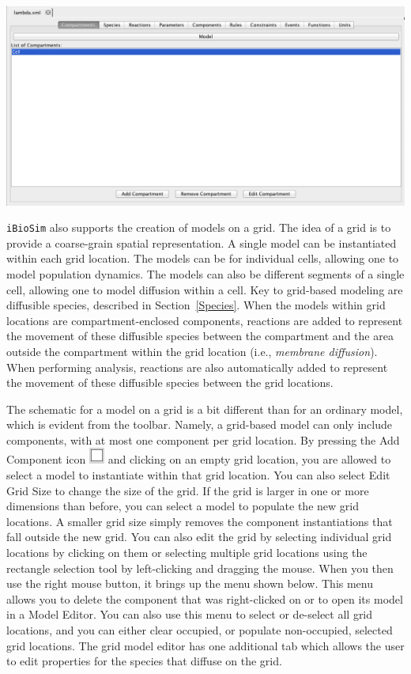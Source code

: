 \documentclass[titlepage,11pt]{article}
\begin{document}
\begin{center}
\includegraphics[width=160mm]{screenshots/textualEditor}
\end{center}

\noindent
{\tt iBioSim} also supports the creation of models on a grid.  The idea of a grid is to provide a coarse-grain spatial representation.  A single model can be instantiated within each grid location.  The models can be for individual cells, allowing one to model population dynamics.  The models can also be different segments of a single cell, allowing one to model diffusion within a cell.  Key to grid-based modeling are diffusible species, described in Section~\ref{Species}.  When the models within grid locations are compartment-enclosed components, reactions are added to represent the movement of these diffusible species between the compartment and the area outside the compartment within the grid location (i.e., \emph{membrane diffusion}).  When performing analysis, reactions are also automatically added to represent the movement of these diffusible species between the grid locations.  

The schematic for a model on a grid is a bit different than for an ordinary model, which is evident from the toolbar.  Namely, a grid-based model can only include components, with at most one component per grid location.  By pressing the Add Component icon \includegraphics{../gui/icons/modelview/add_component_selected} and clicking on an empty grid location, you are allowed to select a model to instantiate within that grid location.  You can also select Edit Grid Size to change the size of the grid.  If the grid is larger in one or more dimensions than before, you can select a model to populate the new grid locations.  A smaller grid size simply removes the component instantiations that fall outside the new grid.  You can also edit the grid by selecting individual grid locations by clicking on them or selecting multiple grid locations using the rectangle selection tool by left-clicking and dragging the mouse.  When you then use the right mouse button, it brings up the menu shown below.  This menu allows you to delete the component that was right-clicked on or to open its model in a Model Editor.  You can also use this menu to select or de-select all grid locations, and you can either clear occupied, or populate non-occupied, selected grid locations.  The grid model editor has one additional tab which allows the user to edit properties for the species that diffuse on the grid.
\end{document}
